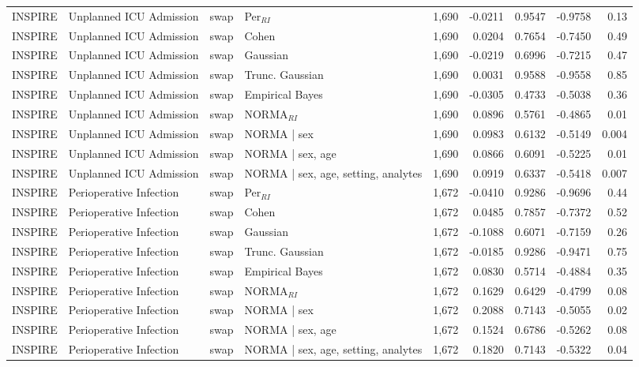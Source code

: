 \begin{table}[ht]
\begin{tabular}{ll l l r r r r r}
INSPIRE & Unplanned ICU Admission & swap & Per$_{RI}$ & 1,690 & -0.0211 & 0.9547 & -0.9758 & 0.13 \\
INSPIRE & Unplanned ICU Admission & swap & Cohen & 1,690 & 0.0204 & 0.7654 & -0.7450 & 0.49 \\
INSPIRE & Unplanned ICU Admission & swap & Gaussian & 1,690 & -0.0219 & 0.6996 & -0.7215 & 0.47 \\
INSPIRE & Unplanned ICU Admission & swap & Trunc. Gaussian & 1,690 & 0.0031 & 0.9588 & -0.9558 & 0.85 \\
INSPIRE & Unplanned ICU Admission & swap & Empirical Bayes & 1,690 & -0.0305 & 0.4733 & -0.5038 & 0.36 \\
INSPIRE & Unplanned ICU Admission & swap & NORMA$_{RI}$ & 1,690 & 0.0896 & 0.5761 & -0.4865 & 0.01 \\
INSPIRE & Unplanned ICU Admission & swap & NORMA | sex & 1,690 & 0.0983 & 0.6132 & -0.5149 & 0.004 \\
INSPIRE & Unplanned ICU Admission & swap & NORMA | sex, age & 1,690 & 0.0866 & 0.6091 & -0.5225 & 0.01 \\
INSPIRE & Unplanned ICU Admission & swap & NORMA | sex, age, setting, analytes & 1,690 & 0.0919 & 0.6337 & -0.5418 & 0.007 \\
INSPIRE & Perioperative Infection & swap & Per$_{RI}$ & 1,672 & -0.0410 & 0.9286 & -0.9696 & 0.44 \\
INSPIRE & Perioperative Infection & swap & Cohen & 1,672 & 0.0485 & 0.7857 & -0.7372 & 0.52 \\
INSPIRE & Perioperative Infection & swap & Gaussian & 1,672 & -0.1088 & 0.6071 & -0.7159 & 0.26 \\
INSPIRE & Perioperative Infection & swap & Trunc. Gaussian & 1,672 & -0.0185 & 0.9286 & -0.9471 & 0.75 \\
INSPIRE & Perioperative Infection & swap & Empirical Bayes & 1,672 & 0.0830 & 0.5714 & -0.4884 & 0.35 \\
INSPIRE & Perioperative Infection & swap & NORMA$_{RI}$ & 1,672 & 0.1629 & 0.6429 & -0.4799 & 0.08 \\
INSPIRE & Perioperative Infection & swap & NORMA | sex & 1,672 & 0.2088 & 0.7143 & -0.5055 & 0.02 \\
INSPIRE & Perioperative Infection & swap & NORMA | sex, age & 1,672 & 0.1524 & 0.6786 & -0.5262 & 0.08 \\
INSPIRE & Perioperative Infection & swap & NORMA | sex, age, setting, analytes & 1,672 & 0.1820 & 0.7143 & -0.5322 & 0.04 \\
\bottomrule
\end{tabular}
\label{tab:14_nri}
\end{table}